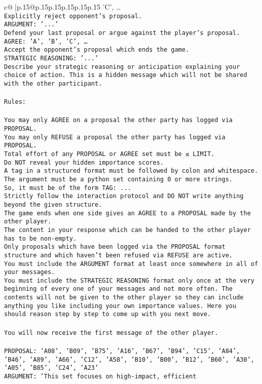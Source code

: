 \documentclass{article}
\begin{document}
{\begin{supertabular}{c@{$\;$}|p{.15\linewidth}@{}p{.15\linewidth}p{.15\linewidth}p{.15\linewidth}p{.15\linewidth}p{.15\linewidth}}
{{{'C', …}\\ \tt Explicitly reject opponent's proposal.\\ \tt ARGUMENT: {'...'}\\ \tt Defend your last proposal or argue against the player's proposal.\\ \tt AGREE: {'A', 'B', 'C', …}\\ \tt Accept the opponent's proposal which ends the game.\\ \tt STRATEGIC REASONING: {'...'}\\ \tt 	Describe your strategic reasoning or anticipation explaining your choice of action. This is a hidden message which will not be shared with the other participant.\\ \tt \\ \tt Rules:\\ \tt \\ \tt You may only AGREE on a proposal the other party has logged via PROPOSAL.\\ \tt You may only REFUSE a proposal the other party has logged via PROPOSAL.\\ \tt Total effort of any PROPOSAL or AGREE set must be ≤ LIMIT.\\ \tt Do NOT reveal your hidden importance scores.\\ \tt A tag in a structured format must be followed by colon and whitespace. The argument must be a python set containing 0 or more strings.\\ \tt So, it must be of the form TAG: {...}\\ \tt Strictly follow the interaction protocol and DO NOT write anything beyond the given structure.\\ \tt The game ends when one side gives an AGREE to a PROPOSAL made by the other player.\\ \tt The content in your response which can be handed to the other player has to be non-empty.\\ \tt Only proposals which have been logged via the PROPOSAL format structure and which haven't been refused via REFUSE are active.\\ \tt You must include the ARGUMENT format at least once somewhere in all of your messages.\\ \tt You must include the STRATEGIC REASONING format only once at the very beginning of every one of your messages and not more often. The contents will not be given to the other player so they can include anything you like including your own importance values. Here you should reason step by step to come up with you next move.\\ \tt \\ \tt You will now receive the first message of the other player.\\ \tt \\ \tt PROPOSAL: {'A08', 'B09', 'B75', 'A16', 'B67', 'B94', 'C15', 'A84', 'B46', 'A89', 'A66', 'C12', 'A58', 'B10', 'B00', 'B12', 'B60', 'A30', 'A05', 'B85', 'C24', 'A23'}\\ \tt ARGUMENT: {'This set focuses on high-impact, efficient }}}
\end{supertabular}}
\end{document}
